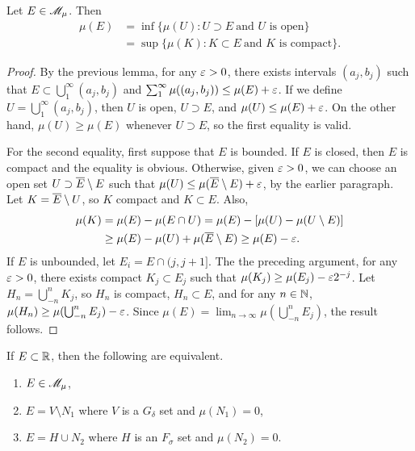 \documentclass[12pt]{article} %
\begin{document}
\begin{theorem}
    Let $E \in \mathscr{M}_\mu$. Then \begin{align*}
        \mu(E) &= \inf\{\mu(U) : U \supset E \ \text{and $U$ is open}\}\\
        &= \sup\{\mu(K) : K \subset E \ \text{and $K$ is compact}\}.
    \end{align*}
\end{theorem}

\begin{proof}
    By the previous lemma, for any $\varepsilon > 0$, there exists intervals $(a_j, b_j)$ such that $E \subset \bigcup_1^\infty (a_j, b_j)$ and $\sum_1^\infty \mu((a_j, b_j)) \leq \mu(E) + \varepsilon$. If we define $U = \bigcup_1^\infty (a_j, b_j)$, then $U$ is open, $U \supset E$, and $\mu(U) \leq \mu(E) + \varepsilon$. On the other hand, $\mu(U) \geq \mu(E)$ whenever $U \supset E$, so the first equality is valid.

    For the second equality, first suppose that $E$ is bounded. If $E$ is closed, then $E$ is compact and the equality is obvious. Otherwise, given $\varepsilon > 0$, we can choose an open set $U \supset \overline{E} \setminus E$ such that $\mu(U) \leq \mu(\overline{E} \setminus E) + \varepsilon$, by the earlier paragraph. Let $K = \overline{E} \setminus U$, so $K$ compact and $K \subset E$. Also, \begin{align*}
        \mu(K) &= \mu(E) - \mu(E \cap U) = \mu(E) - [\mu(U) - \mu(U\setminus E)]\\
        &\geq \mu(E) - \mu(U) + \mu(\overline{E}\setminus E) \geq \mu(E) - \varepsilon.
    \end{align*}
    If $E$ is unbounded, let $E_i = E \cap (j, j+1]$. The the preceding argument, for any $\varepsilon > 0$, there exists compact $K_j \subset E_j$ such that $\mu(K_j) \geq \mu(E_j) - \varepsilon2^{-j}$. Let $H_n = \bigcup_{-n}^{n} K_j$, so $H_n$ is compact, $H_n \subset E$, and for any $n \in \mathbb{N}$, $\mu(H_n) \geq \mu(\bigcup_{-n}^{n} E_j) - \varepsilon$. Since $\mu(E) = \lim_{n \to \infty} \mu(\bigcup_{-n}^{n}E_j)$, the result follows.
\end{proof}

\begin{theorem}\label{thm:characterizing-lebesgue-steiltjes-measurable-sets}
    If $E \subset \mathbb{R}$, then the following are equivalent.\begin{enumerate}
        \item $E \in \mathscr{M}_\mu$,
        \item $E = V \setminus N_1$ where $V$ is a $G_\delta$ set and $\mu(N_1) = 0$,
        \item $E = H \cup N_2$ where $H$ is an $F_\sigma$ set and $\mu(N_2) = 0$.
    \end{enumerate}
\end{theorem}
\end{document}
